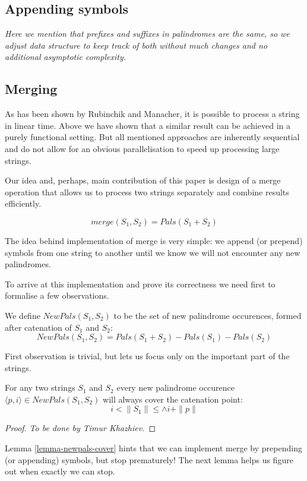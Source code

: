 \subsection{Appending symbols}

\emph{Here we mention that prefixes and suffixes
in palindromes are the same, so we adjust data structure
to keep track of both without much changes and no
additional asymptotic complexity.}

\subsection{Merging}

As has been shown by Rubinchik and Manacher, it is possible
to process a string in linear time. Above we have shown that
a similar result can be achieved in a purely functional setting.
But all mentioned approaches are inherently sequential and
do not allow for an obvious parallelisation to speed up processing
large strings.

Our idea and, perhaps, main contribution of this paper is
design of a merge operation that allows
us to process two strings separately and combine results
efficiently.

$$
merge(S_1, S_2) = Pals(S_1 + S_2)
$$

The idea behind implementation of merge is very simple:
we append (or prepend) symbols from one string to another
until we know we will not encounter any new palindromes.

To arrive at this implementation and prove its correctness
we need first to formalise a few observations.

We define $NewPals(S_1, S_2)$ to be the set of
new palindrome occurences, formed after catenation of $S_1$ and $S_2$:
$$
NewPals(S_1, S_2) = Pals(S_1 + S_2) - Pals(S_1) - Pals(S_2)
$$

First observation is trivial,
but lets us focus only on the important part of the strings.

\begin{lemma}
\label{lemma-newpals-cover}
  For any two strings $S_1$ and $S_2$
  every new palindrome occurence
  $\langle p, i \rangle \in NewPals(S_1, S_2)$
  will always cover the catenation point:
  $$
  i < \|S_1\| \le \land i + \|p\|
  $$
\end{lemma}
\begin{proof}
  \emph{To be done by Timur Khazhiev.}
\end{proof}

Lemma \ref{lemma-newpals-cover} hints that we can implement
merge by prepending (or appending) symbols, but stop prematurely!
The next lemma helps us figure out when exactly we can stop.

